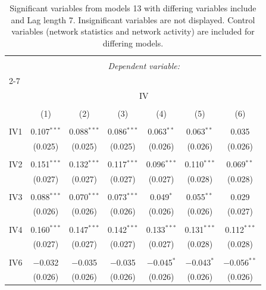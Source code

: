 
\begin{table}[!htbp] \centering 
  \caption{Significant variables from models 13 with differing variables include 
                               and Lag length 7. Insignificant variables are not displayed. 
                               Control variables (network statistics and network activity) are 
                               included for differing models.} 
  \label{IVmodels1_5min_t} 
\scriptsize 
\begin{tabular}{@{\extracolsep{5pt}}lcccccc} 
\\[-1.8ex]\hline 
\hline \\[-1.8ex] 
 & \multicolumn{6}{c}{\textit{Dependent variable:}} \\ 
\cline{2-7} 
\\[-1.8ex] & \multicolumn{6}{c}{IV} \\ 
\\[-1.8ex] & (1) & (2) & (3) & (4) & (5) & (6)\\ 
\hline \\[-1.8ex] 
 IV1 & 0.107$^{***}$ & 0.088$^{***}$ & 0.086$^{***}$ & 0.063$^{**}$ & 0.063$^{**}$ & 0.035 \\ 
  & (0.025) & (0.025) & (0.025) & (0.026) & (0.026) & (0.026) \\ 
  & & & & & & \\ 
 IV2 & 0.151$^{***}$ & 0.132$^{***}$ & 0.117$^{***}$ & 0.096$^{***}$ & 0.110$^{***}$ & 0.069$^{**}$ \\ 
  & (0.027) & (0.027) & (0.027) & (0.027) & (0.028) & (0.028) \\ 
  & & & & & & \\ 
 IV3 & 0.088$^{***}$ & 0.070$^{***}$ & 0.073$^{***}$ & 0.049$^{*}$ & 0.055$^{**}$ & 0.029 \\ 
  & (0.026) & (0.026) & (0.026) & (0.026) & (0.026) & (0.027) \\ 
  & & & & & & \\ 
 IV4 & 0.160$^{***}$ & 0.147$^{***}$ & 0.142$^{***}$ & 0.133$^{***}$ & 0.131$^{***}$ & 0.112$^{***}$ \\ 
  & (0.027) & (0.027) & (0.027) & (0.027) & (0.028) & (0.028) \\ 
  & & & & & & \\ 
 IV6 & $-$0.032 & $-$0.035 & $-$0.035 & $-$0.045$^{*}$ & $-$0.043$^{*}$ & $-$0.056$^{**}$ \\ 
  & (0.026) & (0.026) & (0.026) & (0.026) & (0.026) & (0.026) \\ 

\end{tabular}
\end{table}
